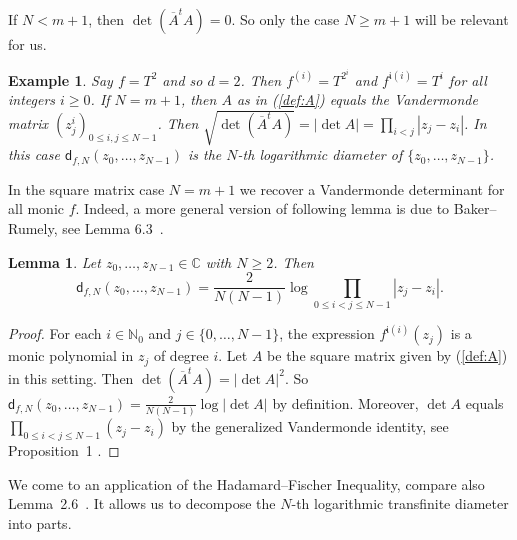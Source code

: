 \documentclass[12pt,oneside,a4]{amsart}
\newcommand{\IC}{\mathbb{C}}
\newcommand{\IN}{\mathbb{N}}
\newcommand{\trans}[1]{{#1}^{t}}
\newcounter{maincounter}
\numberwithin{maincounter}{section}
\numberwithin{equation}{section}
\newtheorem{lemma}[maincounter]{Lemma}
\newtheorem{example}[maincounter]{Example}
\begin{document}
If $N<m+1$, then $\det(\trans{\overline A}A)=0$. So only the case $N\ge
m+1$ will be relevant for us.

\begin{example}
  Say $f = T^2$ and so $d=2$. Then $f^{(i)} = T^{2^i}$ and
  $f^{\mathfrak{i}(i)} = T^i$ for all integers $i\ge 0$.
  If $N=m+1$,
  then   $A$ as in (\ref{def:A})
  equals the Vandermonde matrix $(z_j^{i})_{0\le i,j\le N-1}$.
  Then $\sqrt{\det (\overline{A}^tA)} = |\det A| = \prod_{i<j}|z_j-z_i|$.
  In this case
  $\mathsf{d}_{f,N}(z_0,\ldots,z_{N-1})$ is the $N$-th logarithmic diameter
  of $\{z_0,\ldots,z_{N-1}\}$.
\end{example}

In the square matrix case $N=m+1$ we recover a Vandermonde determinant
for all monic $f$.
Indeed, a more general version of  following lemma is due to
Baker--Rumely, see Lemma 6.3~\cite{BR:06}.
\begin{lemma}
  \label{lem:br}
  Let  $z_0,\ldots,z_{N-1}\in\IC$ with $N\ge 2$. Then
  \begin{equation*}
    \mathsf{d}_{f,N}(z_0,\ldots,z_{N-1}) = \frac{2}{N(N-1)}\log \prod_{0 \le i<j\le
      N-1} |z_j-z_i|.
  \end{equation*}
\end{lemma}
\begin{proof}
  For each $i\in\IN_0$ and $j\in \{0,\ldots,N-1\}$,
  the expression $f^{\mathfrak{i}(i)}(z_j)$ is a monic polynomial in
  $z_j$ of degree $i$.
  Let $A$ be the square matrix given by (\ref{def:A}) in this setting.
  Then $\det(\overline{A}^t A)  = |\!\det A|^2$.
  So $\mathsf{d}_{f,N}(z_0,\ldots,z_{N-1}) = \frac{2}{N(N-1)} \log |\!\det A|$
  by definition. 
  Moreover,  $\det A$
  equals $\prod_{0\le i<j\le N-1} (z_j-z_i)$ by
  the generalized Vandermonde identity, see Proposition~1
  \cite{krattenthaler:adc}. 
\end{proof}


We come to an application of the Hadamard--Fischer Inequality,
compare also Lemma~2.6~\cite{hab:dubinin}. It allows us to decompose the
$N$-th logarithmic transfinite diameter  into parts. 
\end{document}
